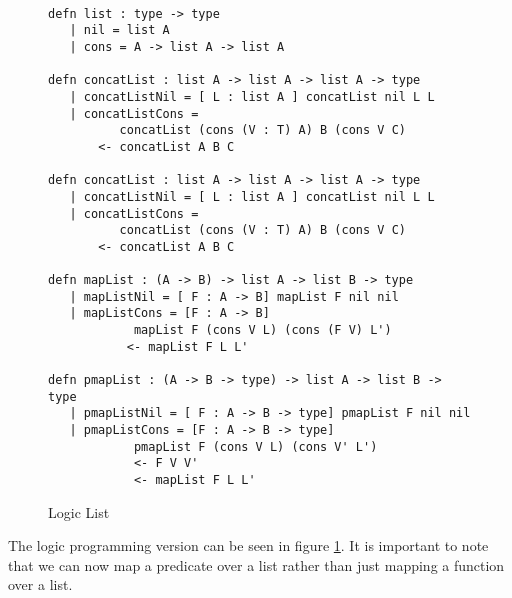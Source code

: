 \begin{figure}[H]
\begin{lstlisting}

defn list : type -> type
   | nil = list A
   | cons = A -> list A -> list A

defn concatList : list A -> list A -> list A -> type
   | concatListNil = [ L : list A ] concatList nil L L
   | concatListCons = 
          concatList (cons (V : T) A) B (cons V C) 
       <- concatList A B C

defn concatList : list A -> list A -> list A -> type
   | concatListNil = [ L : list A ] concatList nil L L
   | concatListCons = 
          concatList (cons (V : T) A) B (cons V C) 
       <- concatList A B C

defn mapList : (A -> B) -> list A -> list B -> type
   | mapListNil = [ F : A -> B] mapList F nil nil
   | mapListCons = [F : A -> B] 
            mapList F (cons V L) (cons (F V) L')
           <- mapList F L L'

defn pmapList : (A -> B -> type) -> list A -> list B -> type
   | pmapListNil = [ F : A -> B -> type] pmapList F nil nil
   | pmapListCons = [F : A -> B -> type] 
            pmapList F (cons V L) (cons V' L')
            <- F V V'
            <- mapList F L L'
\end{lstlisting}
\caption{Logic List}
\label{code:llist}
\end{figure}

The logic programming version can be seen in figure \ref{code:llist}. It is important to note that
we can now map a predicate over a list rather than just mapping a function over a list.
